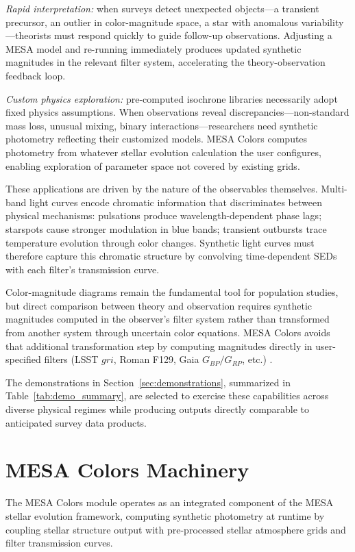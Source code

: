 \documentclass[linenumbers,apj,twocolumn, floatfix]{aastex701}
\begin{document}
\textit{Rapid interpretation:}
when surveys detect unexpected objects—a transient precursor, an outlier in color-magnitude space, a star with anomalous variability—theorists must respond quickly to guide follow-up observations.
Adjusting a MESA model and re-running immediately produces updated synthetic magnitudes in the relevant filter system, accelerating the theory-observation feedback loop.

\textit{Custom physics exploration:}
pre-computed isochrone libraries necessarily adopt fixed physics assumptions.
When observations reveal discrepancies—non-standard mass loss, unusual mixing, binary interactions—researchers need synthetic photometry reflecting their customized models.
MESA Colors computes photometry from whatever stellar evolution calculation the user configures, enabling exploration of parameter space not covered by existing grids.

These applications are driven by the nature of the observables themselves.
Multi-band light curves encode chromatic information that discriminates between physical mechanisms: pulsations produce wavelength-dependent phase lags; starspots cause stronger modulation in blue bands; transient outbursts trace temperature evolution through color changes.
Synthetic light curves must therefore capture this chromatic structure by convolving time-dependent SEDs with each filter's transmission curve.

Color-magnitude diagrams remain the fundamental tool for population studies, but direct comparison between theory and observation requires synthetic magnitudes computed in the observer's filter system rather than transformed from another system through uncertain color equations.
MESA Colors avoids that additional transformation step by computing magnitudes directly in user-specified filters (LSST $gri$, Roman F129, Gaia $G_{BP}/G_{RP}$, etc.)
.

The demonstrations in Section~\ref{sec:demonstrations}, summarized in Table~\ref{tab:demo_summary}, are selected to exercise these capabilities across diverse physical regimes while producing outputs directly comparable to anticipated survey data products.

\section{MESA Colors Machinery}
\label{sec:methods}

The MESA Colors module operates as an integrated component of the MESA stellar evolution framework, computing synthetic photometry at runtime by coupling stellar structure output with pre-processed stellar atmosphere grids and filter transmission curves.
\end{document}
